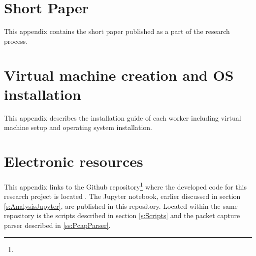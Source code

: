 \appendix
\chapter{Short Paper}
\label{app:ShortPaper}
This appendix contains the short paper published as a part of the research process.



\chapter{Virtual machine creation and OS installation}
\label{app:InstallationGuide}
This appendix describes the installation guide of each worker including virtual machine setup and operating system installation.



\chapter{Electronic resources}
\label{app:ElectronicResources}
This appendix links to the Github repository\footnote{} where the developed code for this research project is located \autocite{Jacobsen_Framework_for_synthetic_2022}.
The Jupyter notebook, earlier discussed in section \ref{s:AnalysisJupyter}, are published in this repository.
Located within the same repository is the scripts described in section \ref{s:Scripts} and the packet capture parser described in \ref{ss:PcapParser}.